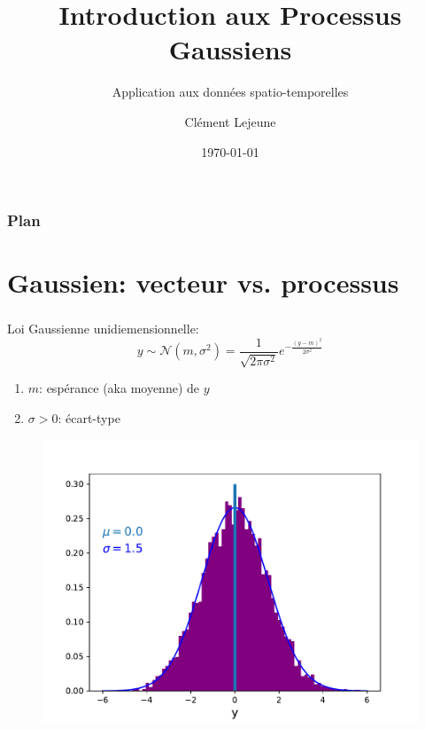 \documentclass[xcolor=svgnames, t]{beamer}
\title[Introduction aux Processus Gaussiens]{Introduction aux Processus Gaussiens}
\subtitle{Application aux données spatio-temporelles}
\institute[]{}
\author[Cl\'ement Lejeune]{Cl\'ement Lejeune}
\institute[TSN/AD/AD3/IA]{
Thales Services Numériques,
\\ AD/AD3/IA
}
\date{\today}
\begin{document}
\frame{\titlepage}

{
  \begin{frame}
    \frametitle{Plan}
    \tableofcontents[currentsection]
  \end{frame}
}

\section{Gaussien: vecteur vs. processus}
\begin{frame}
  \frametitle{\secname}

  Loi Gaussienne unidiemensionnelle:
  \begin{equation*}
    y \sim \mathcal{N}(m, \sigma^2) = \frac{1}{\sqrt{2 \pi \sigma^2}} e^{-\frac{(y-m)^2}{2 \sigma^2}}
  \end{equation*}

  \begin{enumerate}
    \item $m$: espérance (aka moyenne) de $y$
    \item $\sigma > 0$: écart-type
  \end{enumerate}


  \begin{figure}
    \includegraphics[scale=0.4]{gaussian_1d.pdf}
  \end{figure}

\end{frame}
\end{document}
